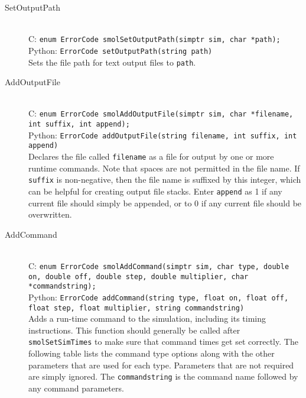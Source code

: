 \documentclass {book}
\begin{document}
\begin{description}

\item[SetOutputPath]
\hfill \\
C: \texttt{enum ErrorCode smolSetOutputPath(simptr sim, char *path);}\\
Python: \texttt{ErrorCode setOutputPath(string path)}\\
Sets the file path for text output files to \texttt{path}.

\item[AddOutputFile]
\hfill \\
C: \texttt{enum ErrorCode smolAddOutputFile(simptr sim, char *filename, int suffix, int append);}\\
Python: \texttt{ErrorCode addOutputFile(string filename, int suffix, int append)}\\
Declares the file called \texttt{filename} as a file for output by one or more runtime commands. Note that spaces are not permitted in the file name. If \texttt{suffix} is non-negative, then the file name is suffixed by this integer, which can be helpful for creating output file stacks. Enter \texttt{append} as 1 if any current file should simply be appended, or to 0 if any current file should be overwritten.

\item[AddCommand]
\hfill \\
C: \texttt{enum ErrorCode smolAddCommand(simptr sim, char type, double on, double off, double step, double multiplier, char *commandstring);}\\
Python: \texttt{ErrorCode addCommand(string type, float on, float off, float step, float multiplier, string commandstring)}\\
Adds a run-time command to the simulation, including its timing instructions. This function should generally be called after \texttt{smolSetSimTimes} to make sure that command times get set correctly. The following table lists the command type options along with the other parameters that are used for each type. Parameters that are not required are simply ignored. The \texttt{commandstring} is the command name followed by any command parameters.


\end{description}
\end{document}

